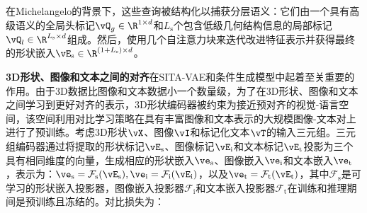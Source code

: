 \documentclass[../../book-main_zh.tex]{subfiles}
\begin{document}
在Michelangelo的背景下，这些查询被结构化以捕获分层语义：它们由一个具有高级语义的全局头标记$\vQ_g \in \R^{1 \times d}$和$L_{\mathrm{s}}$个包含低级几何结构信息的局部标记$\vQ_l \in \R^{L_{\mathrm{s}} \times d}$组成。然后，使用几个自注意力块来迭代改进特征表示并获得最终的形状嵌入$\vE_{\mathrm{s}} 
\in \R^{(1+L_{\mathrm{s}}) \times d}$。



\textbf{3D形状、图像和文本之间的对齐}在SITA-VAE和条件生成模型中起着至关重要的作用。由于3D数据比图像和文本数据小一个数量级，为了在3D形状、图像和文本之间学习到更好对齐的表示，3D形状编码器被约束为接近预对齐的视觉-语言空间，该空间利用对比学习策略在具有丰富图像和文本表示的大规模图像-文本对上进行了预训练。考虑3D形状$\vX$、图像$\vI$和标记化文本$\vT$的输入三元组。三元组编码器通过将提取的形状标记$\vE_{\mathrm{s}}$、图像标记$\vE_{\mathrm{i}}$和文本标记$\vE_{\mathrm{t}}$投影为三个具有相同维度的向量，生成相应的形状嵌入$\ve_{\mathrm{s}}$、图像嵌入$\ve_{\mathrm{i}}$和文本嵌入$\ve_{\mathrm{t}}$，表示为：$\ve_{\mathrm{s}} = \mathcal{F}_{\mathrm{s}}(\vE_{\mathrm{s}}),
\ve_{\mathrm{i}} = \mathcal{F}_{\mathrm{i}}(\vE_{\mathrm{i}})$，以及$\ve_{\mathrm{t}} = \mathcal{F}_{\mathrm{t}}(\vE_{\mathrm{t}})$，其中$\mathcal{F}_{\mathrm{s}}$是可学习的形状嵌入投影器，图像嵌入投影器$\mathcal{F}_{\mathrm{i}}$和文本嵌入投影器$\mathcal{F}_{\mathrm{t}}$在训练和推理期间是预训练且冻结的。对比损失为：
\end{document}
